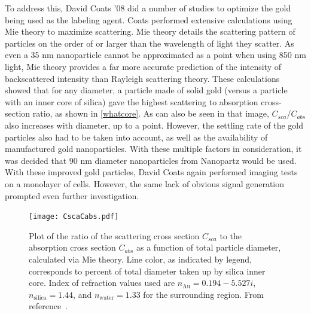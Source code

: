 To address this, David Coats '08 did a number of studies to optimize the gold being used as the labeling agent. Coats performed extensive calculations using Mie theory to maximize scattering. Mie theory details the scattering pattern of particles on the order of or larger than the wavelength of light they scatter. As even a 35 nm nanoparticle cannot be approximated as a point when using 850 nm light, Mie theory provides a far more accurate prediction of the intensity of backscattered intensity than Rayleigh scattering theory. These calculations showed that for any diameter, a particle made of solid gold (versus a particle with an inner core of silica) gave the highest scattering to absorption cross-section ratio, as shown in \autoref{whatcore}. As can also be seen in that image, $C_{sca}/C_{abs}$ also increases with diameter, up to a point. However, the settling rate of the gold particles also had to be taken into account, as well as the availability of manufactured gold nanoparticles. With these multiple factors in consideration, it was decided that 90 nm diameter nanoparticles from Nanopartz would be used. With these improved gold particles, David Coats again performed imaging tests on a monolayer of cells. However, the same lack of obvious signal generation prompted even further investigation.

\begin{figure}[htbp]
\centering
\texttt{[image: CscaCabs.pdf]}
\caption{Plot of the ratio of the scattering cross section $C_{sca}$ to the absorption cross section $C_{abs}$ as a function of total particle diameter, calculated via Mie theory. Line color, as indicated by legend, corresponds to percent of total diameter taken up by silica inner core. Index of refraction values used are $n_{\mathrm{Au}}=0.194 - 5.527i$, $n_{\mathrm{silica}}=1.44$, and $n_{\mathrm{water}}=1.33$ for the surrounding region. From reference~\citep{coats}.}
\label{whatcore}
\end{figure}



